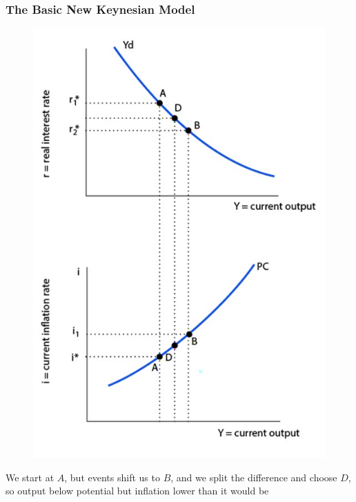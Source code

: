 \documentclass{beamer}
\begin{document}
\begin{frame}
\frametitle[alignment=center]{The Basic New Keynesian Model}
\begin{figure}
\centering
\includegraphics[scale=0.5]{Figures/W_Fig_15pt2.png}
\end{figure}
We start at $A$, but events shift us to $B$, and we split the difference and choose $D$, so output below potential but inflation lower than it would be
\end{frame}
\end{document}

